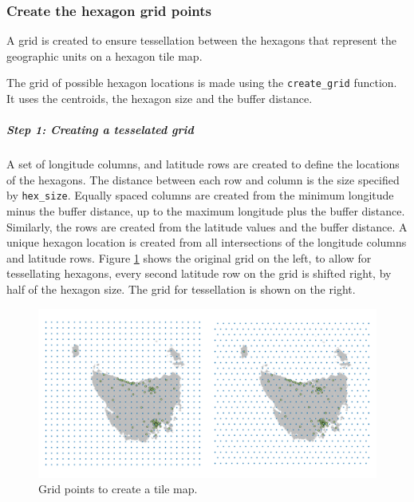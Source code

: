 \documentclass{monashthesis}
\begin{document}
\hypertarget{create-the-hexagon-grid-points}{%
\subsubsection{Create the hexagon grid points}\label{create-the-hexagon-grid-points}}

A grid is created to ensure tessellation between the hexagons that represent the geographic units on a hexagon tile map.

The grid of possible hexagon locations is made using the \texttt{create\_grid} function.
It uses the centroids, the hexagon size and the buffer distance.

\begin{Shaded}
\begin{Highlighting}[]
\StringTok{ }\NormalTok{(} \NormalTok{, } \NormalTok{)}
\end{Highlighting}
\end{Shaded}

\hypertarget{step-1-creating-a-tesselated-grid}{%
\subparagraph{Step 1: Creating a tesselated grid}\label{step-1-creating-a-tesselated-grid}}

A set of longitude columns, and latitude rows are created to define the locations of the hexagons. The distance between each row and column is the size specified by \texttt{hex\_size}.
Equally spaced columns are created from the minimum longitude minus the buffer distance, up to the maximum longitude plus the buffer distance. Similarly, the rows are created from the latitude values and the buffer distance.
A unique hexagon location is created from all intersections of the longitude columns and latitude rows.
Figure \ref{fig:grid2} shows the original grid on the left, to allow for tessellating hexagons, every second latitude row on the grid is shifted right, by half of the hexagon size. The grid for tessellation is shown on the right.

\begin{figure}[H]
\centering
\includegraphics[width=16cm]{figures/03-algorithm/2grid.png}
\caption{\label{fig:grid2}Grid points to create a tile map.}
\end{figure}
\end{document}
